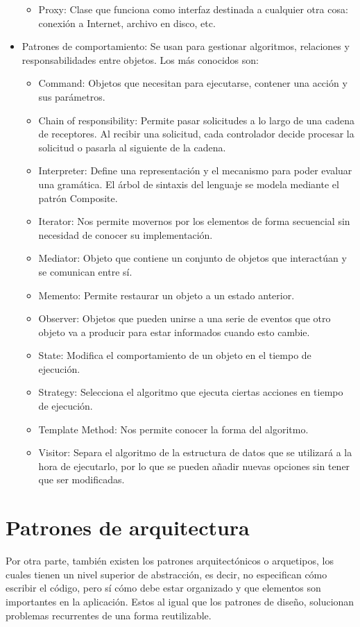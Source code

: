 \documentclass[12pt]{report} %
\begin{document}
\begin{itemize}
\begin{itemize}
 		\item Proxy: Clase que funciona como interfaz destinada a cualquier otra cosa: conexión a Internet, archivo en disco, etc.
 	\end{itemize}
 	\item Patrones de comportamiento: Se usan para gestionar algoritmos, relaciones y responsabilidades entre objetos. Los más conocidos son: 
 	\begin{itemize}
 		\item Command: Objetos que necesitan para ejecutarse, contener una acción y sus parámetros. 
 		\item Chain of responsibility: Permite pasar solicitudes a lo largo de una cadena de receptores. Al recibir una solicitud, cada controlador decide procesar la solicitud o pasarla al siguiente de la cadena.
 		\item Interpreter: Define una representación y el mecanismo para poder evaluar una gramática. El árbol de sintaxis del lenguaje se modela mediante el patrón Composite.
 		\item Iterator: Nos permite movernos por los elementos de forma secuencial sin necesidad de conocer su implementación.
 		\item Mediator: Objeto que contiene un conjunto de objetos que interactúan y se comunican entre sí.
 		\item Memento: Permite restaurar un objeto a un estado anterior.
 		\item Observer: Objetos que pueden unirse a una serie de eventos que otro objeto va a producir para estar informados cuando esto cambie.
 		\item State: Modifica el comportamiento de un objeto en el tiempo de ejecución.
 		\item Strategy: Selecciona el algoritmo que ejecuta ciertas acciones en tiempo de ejecución.
 		\item Template Method: Nos permite conocer la forma del algoritmo.
 		\item Visitor: Separa el algoritmo de la estructura de datos que se utilizará a la hora de ejecutarlo, por lo que se pueden añadir nuevas opciones sin tener que ser modificadas.
 	\end{itemize}
	 \end{itemize}
 \section{Patrones de arquitectura}
 Por otra parte, también existen los patrones arquitectónicos o arquetipos, los cuales tienen un nivel superior de abstracción, es decir, no especifican cómo escribir el código, pero sí cómo debe estar organizado y que elementos son importantes en la aplicación. Estos al igual que los patrones de diseño, solucionan problemas recurrentes de una forma reutilizable.
 
\end{document}
